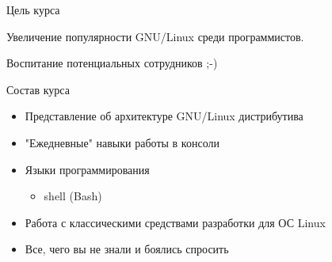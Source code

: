 \begin{frame}{Цель курса}
	\begin{center}
		\Huge
		Увеличение популярности GNU/Linux среди программистов.

		\hrulefill

		\normalsize
		Воспитание потенциальных сотрудников ;-)
	\end{center}
\end{frame}


\begin{frame}{Состав курса}
	\begin{itemize}
		\item Представление об архитектуре GNU/Linux дистрибутива
			\pause
		\item "Ежедневные" навыки работы в консоли
			\pause
		\item Языки программирования
			\begin{itemize}
					\item shell (Bash)
			\end{itemize}
			\pause
		\item Работа с классическими средствами разработки для ОС Linux
			\pause
		\item Все, чего вы не знали и боялись спросить
	\end{itemize}
\end{frame}
